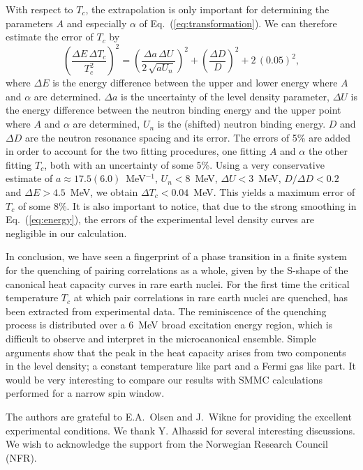 With respect to $T_c$, the extrapolation is only important for determining the 
parameters $A$ and especially $\alpha$ of Eq.~(\ref{eq:transformation}). We can
therefore estimate the error of $T_c$ by 
\begin{equation}
\left(\frac{\Delta E\,\Delta T_c}{T_c^2}\right)^2=
\left(\frac{\Delta a\,\Delta U}{2\,\sqrt{aU_n}}\right)^2+
\left(\frac{\Delta D}{D}\right)^2+2\,(0.05)^2,
\end{equation}
where $\Delta E$ is the energy difference between the upper and lower energy
where $A$ and $\alpha$ are determined. $\Delta a$ is the uncertainty of the 
level density parameter, $\Delta U$ is the energy difference between the 
neutron binding energy and the upper point where $A$ and $\alpha$ are 
determined, $U_n$ is the (shifted) neutron binding energy. $D$ and $\Delta D$ 
are the neutron resonance spacing and its error. The errors of 5\% are added in
order to account for the two fitting procedures, one fitting $A$ and $\alpha$ 
the other fitting $T_c$, both with an uncertainty of some 5\%. Using a very 
conservative estimate of $a\approx 17.5(6.0)$~MeV$^{-1}$, $U_n<8$~MeV, 
$\Delta U<3$~MeV, $D/\Delta D<0.2$ and $\Delta E>4.5$~MeV, we obtain 
$\Delta T_c<0.04$~MeV. This yields a maximum error of $T_c$ of some 8\%. It is
also important to notice, that due to the strong smoothing in 
Eq.~(\ref{eq:energy}), the errors of the experimental level density curves are
negligible in our calculation.

In conclusion, we have seen a fingerprint of a phase transition in a finite 
system for the quenching of pairing correlations as a whole, given by the 
S-shape of the canonical heat capacity curves in rare earth nuclei. For the 
first time the critical temperature $T_c$ at which pair correlations in rare 
earth nuclei are quenched, has been extracted from experimental data. The 
reminiscence of the quenching process is distributed over a 6~MeV broad 
excitation energy region, which is difficult to observe and interpret in the 
microcanonical ensemble. Simple arguments show that the peak in the heat 
capacity arises from two components in the level density; a constant 
temperature like part and a Fermi gas like part. It would be very interesting 
to compare our results with SMMC calculations performed for a narrow spin 
window.

The authors are grateful to E.A.~Olsen and J.~Wikne for providing the excellent
experimental conditions. We thank Y. Alhassid for several interesting 
discussions. We wish to acknowledge the support from the Norwegian Research 
Council (NFR). 

